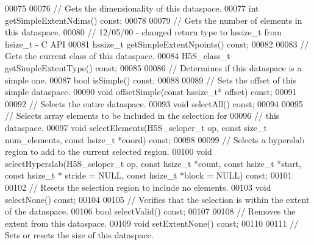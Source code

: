 \begin{DoxyCode}
00075 
00076         \textcolor{comment}{// Gets the dimensionality of this dataspace.}
00077         \textcolor{keywordtype}{int} getSimpleExtentNdims() \textcolor{keyword}{const};
00078 
00079         \textcolor{comment}{// Gets the number of elements in this dataspace.}
00080         \textcolor{comment}{// 12/05/00 - changed return type to hssize\_t from hsize\_t - C API}
00081         hssize\_t getSimpleExtentNpoints() \textcolor{keyword}{const};
00082 
00083         \textcolor{comment}{// Gets the current class of this dataspace.}
00084         H5S\_class\_t getSimpleExtentType() \textcolor{keyword}{const};
00085 
00086         \textcolor{comment}{// Determines if this dataspace is a simple one.}
00087         \textcolor{keywordtype}{bool} isSimple() \textcolor{keyword}{const};
00088 
00089         \textcolor{comment}{// Sets the offset of this simple dataspace.}
00090         \textcolor{keywordtype}{void} offsetSimple(\textcolor{keyword}{const} hssize\_t* offset) \textcolor{keyword}{const};
00091 
00092         \textcolor{comment}{// Selects the entire dataspace.}
00093         \textcolor{keywordtype}{void} selectAll() \textcolor{keyword}{const};
00094 
00095         \textcolor{comment}{// Selects array elements to be included in the selection for}
00096         \textcolor{comment}{// this dataspace.}
00097         \textcolor{keywordtype}{void} selectElements(H5S\_seloper\_t op, \textcolor{keyword}{const} \textcolor{keywordtype}{size\_t} num\_elements, \textcolor{keyword}{const} hsize\_t *coord) \textcolor{keyword}{const};
00098 
00099         \textcolor{comment}{// Selects a hyperslab region to add to the current selected region.}
00100         \textcolor{keywordtype}{void} selectHyperslab(H5S\_seloper\_t op, \textcolor{keyword}{const} hsize\_t *count, \textcolor{keyword}{const} hsize\_t *start, \textcolor{keyword}{const} hsize\_t *
      stride = NULL, \textcolor{keyword}{const} hsize\_t *block = NULL) \textcolor{keyword}{const};
00101 
00102         \textcolor{comment}{// Resets the selection region to include no elements.}
00103         \textcolor{keywordtype}{void} selectNone() \textcolor{keyword}{const};
00104 
00105         \textcolor{comment}{// Verifies that the selection is within the extent of the dataspace.}
00106         \textcolor{keywordtype}{bool} selectValid() \textcolor{keyword}{const};
00107 
00108         \textcolor{comment}{// Removes the extent from this dataspace.}
00109         \textcolor{keywordtype}{void} setExtentNone() \textcolor{keyword}{const};
00110 
00111         \textcolor{comment}{// Sets or resets the size of this dataspace.}

\end{DoxyCode}
